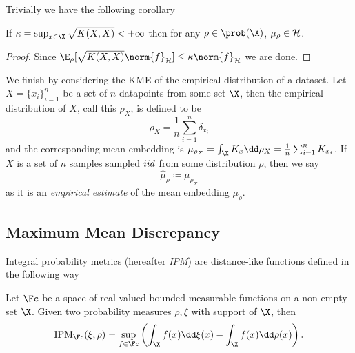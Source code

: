 Trivially we have the following corollary
\begin{corollary} If \(\kappa = \sup_{x \in \X}\sqrt{K(X, X)} < +\infty\) then
for any \(\rho \in \prob(\X)\), \(\mu_{\rho} \in \mathcal{H}\).
\end{corollary}

\begin{proof} Since \(\E_{\rho}[\sqrt{K(X, X)} \norm{f}_{\rkhs{H}}] \leq \kappa
\norm{f}_{\rkhs{H}}\) we are done.
\end{proof}

We finish by considering the KME of the empirical distribution of a dataset. Let
\(X = \{x_{i}\}_{i=1}^{n}\) be a set of \(n\) datapoints from some set
\(\X\), then the empirical distribution of \(X\), call this \(\rho_{X}\), is
defined to be
\begin{equation}
  \label{eq:empirical-distribution}
  \rho_{X} = \frac{1}{n}\sum_{i=1}^{n} \delta_{x_{i}}
\end{equation} and the corresponding mean embedding is \(\mu_{\rho_{X}} =
\int_{\X} K_{x} \dd \rho_{X} = \frac{1}{n} \sum_{i=1}^{n}K_{x_{i}}\). If \(X\) is
a set of \(n\) samples sampled \(iid\) from some distribution \(\rho\), then
we say
\begin{equation}
\label{eq:empirical-kernel-mean-embedding} \hat{\mu}_{\rho} \coloneqq
\mu_{\rho_{X}}
\end{equation} as it is an \emph{empirical estimate} of the mean embedding
\(\mu_{\rho}\).

\subsection{Maximum Mean Discrepancy} Integral probability metrics (hereafter
\emph{IPM}) \cite{mueller97_integ_probab_metric_their_gener_class_funct} are
distance-like functions defined in the following way
\begin{definition}
\label{def:IPM} Let \(\Fc\) be a space of real-valued bounded measurable
functions on a non-empty set \(\X\). Given two probability measures \(\rho,
\xi\) with support of \(\X\), then
  \begin{equation}
    \label{eq:IPM} \mathrm{IPM}_{\Fc}(\xi, \rho) = \sup_{f \in \Fc}\left(
\int_{\X}f(x) \dd \xi(x) - \int_{\X}f(x) \dd \rho(x) \right).
  \end{equation}
\end{definition}

